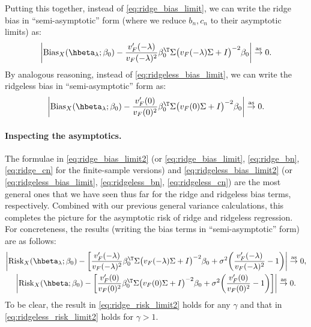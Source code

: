 \documentclass{article}
\begin{document}
Putting this together, instead of \eqref{eq:ridge_bias_limit}, we can write the 
ridge bias in ``semi-asymptotic'' form (where we reduce $b_n,c_n$ to their
asymptotic limits) as:     
\begin{equation}
\label{eq:ridge_bias_limit2}
\bigg| \Bias_X(\hbeta_\lambda; \beta_0) - \frac{v'_F(-\lambda)}{v_F(-\lambda)^2}
\beta_0^\T \Sigma \big( v_F(-\lambda) \Sigma + I \big)^{-2} \beta_0 \bigg| \asto
0.
\end{equation}
By analogous reasoning, instead of \eqref{eq:ridgeless_bias_limit}, we can write
the ridgeless bias in ``semi-asymptotic'' form as:
\begin{equation}
\label{eq:ridgeless_bias_limit2}
\bigg| \Bias_X(\hbeta_\lambda; \beta_0) - \frac{v'_F(0)}{v_F(0)^2} \beta_0^\T
\Sigma \big( v_F(0) \Sigma + I \big)^{-2} \beta_0 \bigg| \asto 0.
\end{equation}

\paragraph{Inspecting the asymptotics.}

The formulae in \eqref{eq:ridge_bias_limit2} (or \eqref{eq:ridge_bias_limit},
\eqref{eq:ridge_bn}, \eqref{eq:ridge_cn} for the finite-sample versions) and 
\eqref{eq:ridgeless_bias_limit2} (or \eqref{eq:ridgeless_bias_limit},
\eqref{eq:ridgeless_bn}, \eqref{eq:ridgeless_cn}) are the most general ones that
we have seen thus far for the ridge and ridgeless bias terms,
respectively. Combined with our previous general variance calculations, 
this completes the picture for the asymptotic risk of ridge and ridgeless
regression. For concreteness, the results (writing the bias terms in
``semi-asymptotic'' form) are as follows:
\begin{gather}
\label{eq:ridge_risk_limit2}
\bigg| \Risk_X(\hbeta_\lambda; \beta_0) - \bigg[
\frac{v'_F(-\lambda)}{v_F(-\lambda)^2} \beta_0^\T \Sigma \big( v_F(-\lambda)
\Sigma + I \big)^{-2} \beta_0 + \sigma^2 \bigg(
\frac{v'_F(-\lambda)}{v_F(-\lambda)^2} - 1 \bigg) \bigg|  \asto 0, \\     
\label{eq:ridgeless_risk_limit2}
\bigg| \Risk_X(\hbeta; \beta_0) - \bigg[ \frac{v'_F(0)}{v_F(0)^2} \beta_0^\T
\Sigma \big( v_F(0) \Sigma + I \big)^{-2} \beta_0 + \sigma^2 \bigg(
\frac{v'_F(0)}{v_F(0)^2} - 1 \bigg) \bigg] \bigg| \asto 0.
\end{gather}
To be clear, the result in \eqref{eq:ridge_risk_limit2} holds for any $\gamma$
and that in \eqref{eq:ridgeless_risk_limit2} holds for $\gamma>1$.
\end{document}
